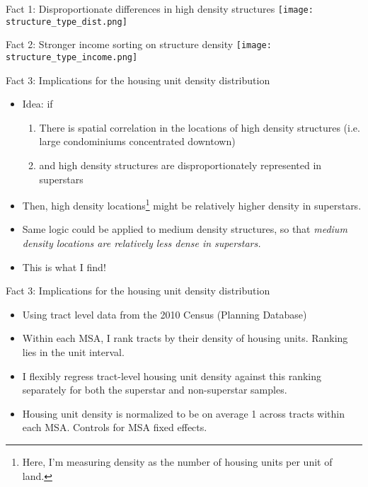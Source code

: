 \documentclass{beamer}
\theoremstyle{plain}
\begin{document}
\begin{frame}{Fact 1: Disproportionate differences in high density structures}
 \texttt{[image: structure\_type\_dist.png]}
\end{frame}

\begin{frame}{Fact 2: Stronger income sorting on structure density}
\texttt{[image: structure\_type\_income.png]}
\end{frame}

\begin{frame}{Fact 3: Implications for the housing unit density distribution}
\begin{itemize}
	\color{black}
	\item Idea: if
	\begin{enumerate}
		\item There is spatial correlation in the locations of high density structures (i.e. large condominiums concentrated downtown) \pause
		\item and high density structures are disproportionately represented in superstars
	\end{enumerate}
\item Then, high density locations\footnote{Here, I'm measuring density as the number of housing units per unit of land.} might be relatively higher density in superstars. 
\item Same logic could be applied to \color{red} medium \color{black} density structures, so that \textit{\color{red} medium \color{black} density locations are relatively less dense in superstars.}
\item This is what I find!
\end{itemize}
\end{frame}

\begin{frame}{Fact 3: Implications for the housing unit density distribution}
\begin{itemize}
	\color{black}
	\item Using tract level data from the 2010 Census (Planning Database) \pause
	\item Within each MSA, I rank tracts by their density of housing units. Ranking lies in the unit interval. \pause
	\item I flexibly regress tract-level housing unit density against this ranking separately for both the superstar and non-superstar samples. \pause
	\item Housing unit density is \color{red} normalized to be on average 1 \color{black} across tracts within each MSA. Controls for MSA fixed effects. 
\end{itemize}
\end{frame}
\end{document}
